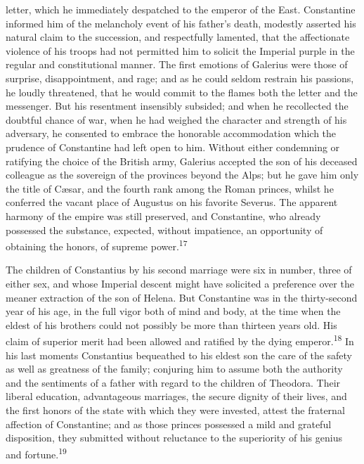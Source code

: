 letter, which he immediately despatched to the emperor of the
East. Constantine informed him of the melancholy event of his
father’s death, modestly asserted his natural claim to the
succession, and respectfully lamented, that the affectionate
violence of his troops had not permitted him to solicit the
Imperial purple in the regular and constitutional manner. The
first emotions of Galerius were those of surprise,
disappointment, and rage; and as he could seldom restrain his
passions, he loudly threatened, that he would commit to the
flames both the letter and the messenger. But his resentment
insensibly subsided; and when he recollected the doubtful chance
of war, when he had weighed the character and strength of his
adversary, he consented to embrace the honorable accommodation
which the prudence of Constantine had left open to him. Without
either condemning or ratifying the choice of the British army,
Galerius accepted the son of his deceased colleague as the
sovereign of the provinces beyond the Alps; but he gave him only
the title of Cæsar, and the fourth rank among the Roman princes,
whilst he conferred the vacant place of Augustus on his favorite
Severus. The apparent harmony of the empire was still preserved,
and Constantine, who already possessed the substance, expected,
without impatience, an opportunity of obtaining the honors, of
supreme power.\textsuperscript{17}




The children of Constantius by his second marriage were six in
number, three of either sex, and whose Imperial descent might
have solicited a preference over the meaner extraction of the son
of Helena. But Constantine was in the thirty-second year of his
age, in the full vigor both of mind and body, at the time when
the eldest of his brothers could not possibly be more than
thirteen years old. His claim of superior merit had been allowed
and ratified by the dying emperor.\textsuperscript{18} In his last moments
Constantius bequeathed to his eldest son the care of the safety
as well as greatness of the family; conjuring him to assume both
the authority and the sentiments of a father with regard to the
children of Theodora. Their liberal education, advantageous
marriages, the secure dignity of their lives, and the first
honors of the state with which they were invested, attest the
fraternal affection of Constantine; and as those princes
possessed a mild and grateful disposition, they submitted without
reluctance to the superiority of his genius and fortune.\textsuperscript{19}

